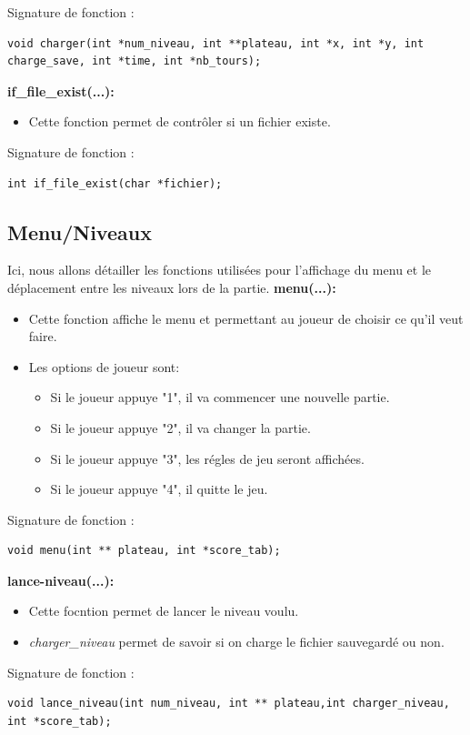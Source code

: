 \documentclass{article}
\begin{document}
Signature de fonction :
\begin{lstlisting}
void charger(int *num_niveau, int **plateau, int *x, int *y, int charge_save, int *time, int *nb_tours);
\end{lstlisting}
\textbf{if\_file\_exist(...):}
\begin{itemize}
\item Cette fonction permet de contrôler si un fichier existe.
\end{itemize}
Signature de fonction :
\begin{lstlisting}
int if_file_exist(char *fichier);
\end{lstlisting}
\newpage

\subsection{Menu/Niveaux}
Ici, nous allons détailler les fonctions utilisées pour l'affichage du menu et le déplacement entre les niveaux lors de la partie.
\newline
\textbf{menu(...):}
\begin{itemize}
\item Cette fonction affiche le menu et permettant au joueur de choisir ce qu'il veut faire.
\item Les options de joueur sont: 
\begin{itemize}
\item Si le joueur appuye "1", il va commencer une nouvelle partie.
\item Si le joueur appuye "2", il va changer la partie.
\item Si le joueur appuye "3", les régles de jeu seront affichées.
\item Si le joueur appuye "4", il quitte le jeu.
\end{itemize}
\end{itemize}
Signature de fonction :
\begin{lstlisting}
void menu(int ** plateau, int *score_tab);
\end{lstlisting}
\textbf{lance-niveau(...):}
\begin{itemize}
\item Cette focntion permet de lancer le niveau voulu.
\item \textit{charger\_niveau} permet de savoir si on charge le fichier sauvegardé ou non.
\end{itemize}
Signature de fonction :
\begin{lstlisting}
void lance_niveau(int num_niveau, int ** plateau,int charger_niveau, int *score_tab);
\end{lstlisting}
\end{document}
